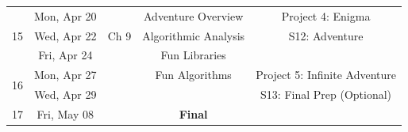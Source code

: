 \documentclass[varwidth]{standalone}
\begin{document}
\begin{longtable}{ccccc}
\midrule
\multirow{3}{*}{15} & \multirow{1}{*}{Mon, Apr 20} &  & Adventure Overview & Project 4: 
Enigma \\
& \multirow{1}{*}{Wed, Apr 22} & Ch 9 & Algorithmic Analysis & S12: Adventure \\
& \multirow{1}{*}{Fri, Apr 24} &  & Fun Libraries &  \\
\midrule
\multirow{2}{*}{16} & \multirow{1}{*}{Mon, Apr 27} &  & Fun Algorithms & Project 5: Infinite 
Adventure \\
& \multirow{1}{*}{Wed, Apr 29} &  &  & S13: Final Prep (Optional) \\
\midrule
\multirow{1}{*}{17} & \multirow{1}{*}{Fri, May 08} &  & \textbf{Final} &  \\
\bottomrule
\end{longtable}
\end{document}
